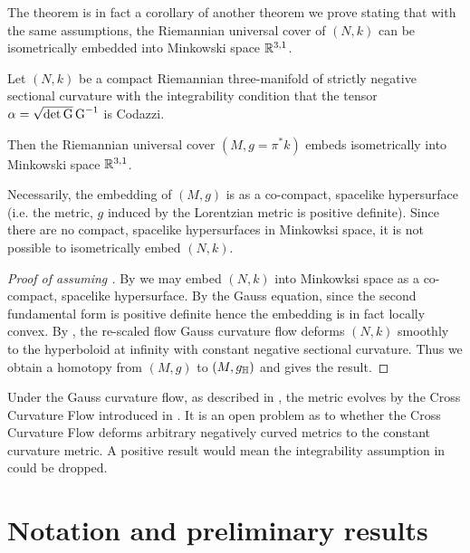 \documentclass[a4paper, 12pt]{amsart}
\begin{document}
The theorem is in fact a corollary of another theorem we prove stating that with the same assumptions, the Riemannian universal cover of \((N, k)\) can be isometrically embedded into Minkowski space \(\mathbb{R}^{3,1}\).

\begin{thm}
\label{thm:intg_embed}
Let \((N, k)\) be a compact Riemannian three-manifold of strictly negative sectional curvature with the integrability condition that the tensor \(\alpha = \sqrt{\det \operatorname{G}} \operatorname{G}^{-1}\) is Codazzi.

Then the Riemannian universal cover \((M, g = \pi^{\ast} k)\) embeds isometrically into Minkowski space \(\mathbb{R}^{3,1}\).
\end{thm}

\begin{rem}
Necessarily, the embedding of \((M, g)\) is as a co-compact, spacelike hypersurface (i.e. the metric, \(g\) induced by the Lorentzian metric is positive definite). Since there are no compact, spacelike hypersurfaces in Minkowksi space, it is not possible to isometrically embed \((N, k)\).
\end{rem}

\begin{proof}
[Proof of  assuming ]

By  we may embed \((N, k)\) into Minkowksi space as a co-compact, spacelike hypersurface. By the Gauss equation, since the second fundamental form is positive definite hence the embedding is in fact locally convex. By \cite[Theorem 1.1]{MR3344442}, the re-scaled flow Gauss curvature flow deforms \((N, k)\) smoothly to the hyperboloid at infinity with constant negative sectional curvature. Thus we obtain a homotopy from \((M, g)\) to \((M, g_{\mathbb{H}})\) and  gives the result.
\end{proof}

\begin{rem}
Under the Gauss curvature flow, as described in \cite[12. Application to the cross-curvature flow]{MR3344442}, the metric evolves by the Cross Curvature Flow introduced in \cite{MR2055396}. It is an open problem as to whether the Cross Curvature Flow deforms arbitrary negatively curved metrics to the constant curvature metric. A positive result would mean the integrability assumption in  could be dropped.
\end{rem}

\section{Notation and preliminary results}
\label{sec:notation}
\end{document}
